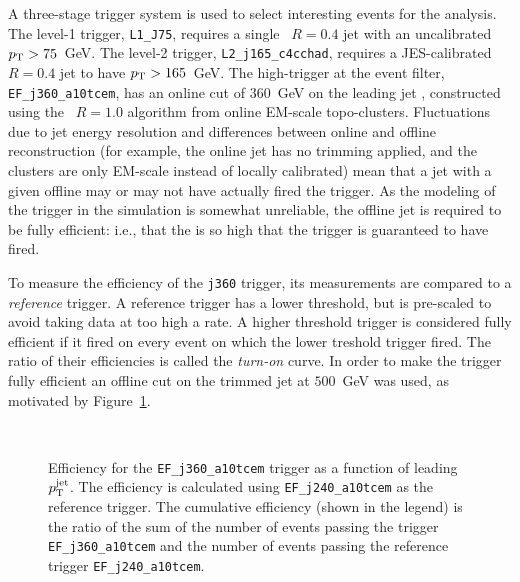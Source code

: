A three-stage trigger system is used to select interesting events for the analysis. The level-1 trigger, \texttt{L1\_J75}, requires a single \antikt\ $R=0.4$ jet with an uncalibrated $p_{\text{T}} > 75$~GeV. The level-2 trigger, \texttt{L2\_j165\_c4cchad}, requires a JES-calibrated \antikt\ $R=0.4$ jet to have $p_{\text{T}} > 165$~GeV. The high-\pt trigger at the event filter, \texttt{EF\_j360\_a10tcem}, has an online cut of $360$~GeV on the leading jet \pt, constructed using the \antikt\ $R=1.0$ algorithm from online EM-scale topo-clusters. Fluctuations due to jet energy resolution and differences between online and offline reconstruction (for example, the online jet has no trimming applied, and the clusters are only EM-scale instead of locally calibrated) mean that a jet with a given offline \pt may or may not have actually fired the trigger. As the modeling of the trigger in the simulation is somewhat unreliable, the offline jet \pt is required to be fully efficient: i.e., that the \pt is so high that the trigger is guaranteed to have fired.

To measure the efficiency of the \texttt{j360} trigger, its measurements are compared to a \textit{reference} trigger. A reference trigger has a lower \pt threshold, but is pre-scaled to avoid taking data at too high a rate. A higher \pt threshold trigger is considered fully efficient if it fired on every event on which the lower \pt treshold trigger fired. The ratio of their efficiencies is called the \textit{turn-on} curve. In order to make the trigger fully efficient an offline \pt cut on the trimmed jet \pt at $500$~GeV was used, as motivated by Figure~\ref{fig:search:search:trig:pt1}. 

\begin{figure}[!ht]
  \centering
  \\
    \caption{Efficiency for the \texttt{EF\_j360\_a10tcem} trigger as a function of leading $p_{\text{T}}^\mathrm{jet}$. The efficiency is calculated using \texttt{EF\_j240\_a10tcem} as the reference trigger. The cumulative efficiency (shown in the legend) is the ratio of the sum of the number of events passing the trigger \texttt{EF\_j360\_a10tcem} and the number of events passing the reference trigger \texttt{EF\_j240\_a10tcem}. }
  \label{fig:search:search:trig:pt1}
\end{figure}

